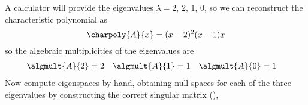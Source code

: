 A calculator will provide the eigenvalues $\lambda=2,\,2,\,1,\,0$, so we can reconstruct the characteristic polynomial as
%
\begin{equation*}
\charpoly{A}{x}=(x-2)^2(x-1)x
\end{equation*}
%
so the algebraic multiplicities of the eigenvalues are
%
\begin{align*}
\algmult{A}{2}&=2&
\algmult{A}{1}&=1&
\algmult{A}{0}&=1
\end{align*}
%
Now compute eigenspaces by hand, obtaining null spaces for each of the three eigenvalues by constructing the correct singular matrix (),
%

